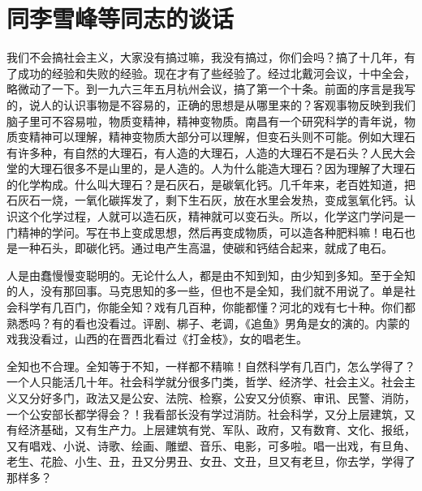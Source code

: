 \section[同李雪峰等同志的谈话（一九六四年八月二十日）]{同李雪峰等同志的谈话}


我们不会搞社会主义，大家没有搞过嘛，我没有搞过，你们会吗？搞了十几年，有了成功的经验和失败的经验。现在才有了些经验了。经过北戴河会议，十中全会，略微动了一下。到一九六三年五月杭州会议，搞了第一个十条。前面的序言是我写的，说人的认识事物是不容易的，正确的思想是从哪里来的？客观事物反映到我们脑子里可不容易啦，物质变精神，精神变物质。南昌有一个研究科学的青年说，物质变精神可以理解，精神变物质大部分可以理解，但变石头则不可能。例如大理石有许多种，有自然的大理石，有人造的大理石，人造的大理石不是石头？人民大会堂的大理石很多不是山里的，是人造的。人为什么能造大理石？因为理解了大理石的化学构成。什么叫大理石？是石灰石，是碳氧化钙。几千年来，老百姓知道，把石灰石一烧，一氧化碳挥发了，剩下生石灰，放在水里会发热，变成氢氧化钙。认识这个化学过程，人就可以造石灰，精神就可以变石头。所以，化学这门学问是一门精神的学问。写在书上变成思想，然后再变成物质，可以造各种肥料嘛！电石也是一种石头，即碳化钙。通过电产生高温，使碳和钙结合起来，就成了电石。

人是由蠢慢慢变聪明的。无论什么人，都是由不知到知，由少知到多知。至于全知的人，没有那回事。马克思知的多一些，但也不是全知，我们就不用说了。单是社会科学有几百门，你能全知？戏有几百种，你能都懂？河北的戏有七十种。你们都熟悉吗？有的看也没看过。评剧、梆子、老调，《追鱼》男角是女的演的。内蒙的戏我没看过，山西的在晋西北看过《打金枝》，女的唱老生。

全知也不合理。全知等于不知，一样都不精嘛！自然科学有几百门，怎么学得了？一个人只能活几十年。社会科学就分很多门类，哲学、经济学、社会主义。社会主义又分好多门，政法又是公安、法院、检察，公安又分侦察、审讯、民警、消防，一个公安部长都学得会？！我看部长没有学过消防。社会科学，又分上层建筑，又有经济基础，又有生产力。上层建筑有党、军队、政府，又有数育、文化、报纸，又有唱戏、小说、诗歌、绘画、雕塑、音乐、电影，可多啦。唱一出戏，有旦角、老生、花脸、小生、丑，丑又分男丑、女丑、文丑，旦又有老旦，你去学，学得了那样多？


